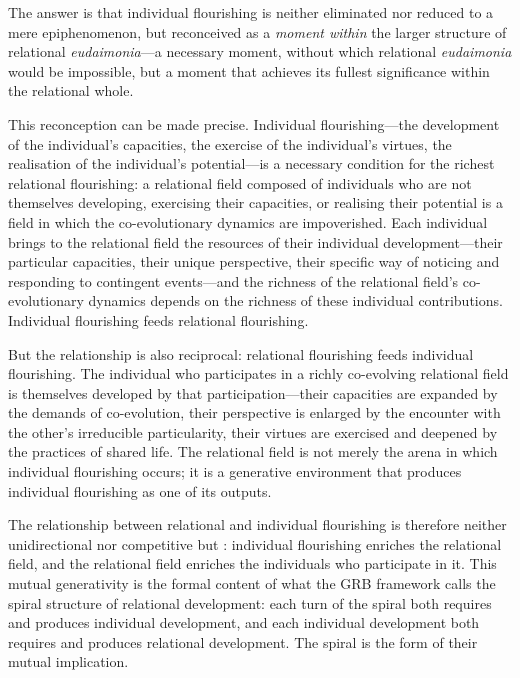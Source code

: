 The answer is that individual flourishing is neither eliminated nor reduced to a mere epiphenomenon, but reconceived as a \emph{moment within} the larger structure of relational \emph{eudaimonia}---a necessary moment, without which relational \emph{eudaimonia} would be impossible, but a moment that achieves its fullest significance within the relational whole.

This reconception can be made precise. Individual flourishing---the development of the individual's capacities, the exercise of the individual's virtues, the realisation of the individual's potential---is a necessary condition for the richest relational flourishing: a relational field composed of individuals who are not themselves developing, exercising their capacities, or realising their potential is a field in which the co-evolutionary dynamics are impoverished. Each individual brings to the relational field the resources of their individual development---their particular capacities, their unique perspective, their specific way of noticing and responding to contingent events---and the richness of the relational field's co-evolutionary dynamics depends on the richness of these individual contributions. Individual flourishing feeds relational flourishing.

But the relationship is also reciprocal: relational flourishing feeds individual flourishing. The individual who participates in a richly co-evolving relational field is themselves developed by that participation---their capacities are expanded by the demands of co-evolution, their perspective is enlarged by the encounter with the other's irreducible particularity, their virtues are exercised and deepened by the practices of shared life. The relational field is not merely the arena in which individual flourishing occurs; it is a generative environment that produces individual flourishing as one of its outputs.

The relationship between relational and individual flourishing is therefore neither unidirectional nor competitive but : individual flourishing enriches the relational field, and the relational field enriches the individuals who participate in it. This mutual generativity is the formal content of what the GRB framework calls the spiral structure of relational development: each turn of the spiral both requires and produces individual development, and each individual development both requires and produces relational development. The spiral is the form of their mutual implication.

